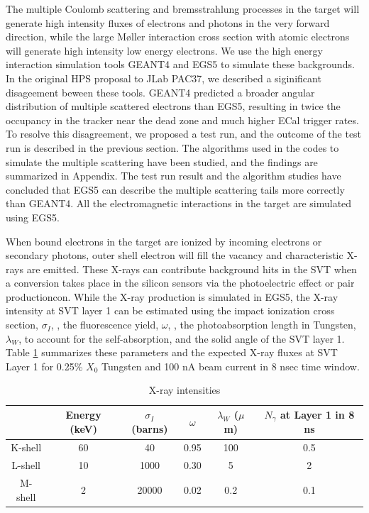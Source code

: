 The multiple Coulomb scattering and bremsstrahlung processes in the target will generate high 
intensity fluxes of electrons and photons in the very forward direction, while the large
M{\o}ller interaction cross section with atomic electrons will generate high intensity low energy
electrons. We use the high energy interaction simulation tools GEANT4 and EGS5 to simulate 
these backgrounds. In the original HPS proposal to JLab PAC37, we described a siginificant 
disageement beween these tools. GEANT4 predicted a broader angular
distribution of multiple scattered electrons than EGS5, resulting in twice the occupancy in the
tracker near the dead zone and much higher ECal trigger rates. 
To resolve this disagreement, we proposed a test run, and the outcome of the test run is described 
in the previous section. The algorithms used 
in the codes to simulate the multiple scattering have been studied, and the findings are summarized in
Appendix. The test run result and the algorithm studies have concluded that EGS5 can describe the multiple scattering 
tails more correctly than GEANT4. All the electromagnetic interactions in the target are simulated using EGS5.   

When bound electrons in the target are ionized by incoming electrons or secondary photons, outer 
shell electron will fill the vacancy and characteristic X-rays are emitted. 
These X-rays can contribute background hits in
the SVT when a conversion takes place in the silicon sensors via the photoelectric effect 
or pair productioncon. While the X-ray production is simulated in EGS5, the X-ray intensity at SVT layer 1
can be estimated using  the impact ionization 
cross section, $\sigma_I$, \cite{hoffmann}, the fluorescence yield, $\omega$, \cite{hubbell},
the photoabsorption length in Tungsten, $\lambda_W$, to account for the self-absorption, and the solid 
angle of the SVT layer 1.
Table \ref{tab:xray} summarizes these parameters and the expected X-ray
fluxes at SVT Layer 1 for 0.25\% $X_0$ Tungsten and 100 nA beam current in 8 nsec time window. 

\begin{table}[h]
\begin{center}
\begin{tabular}{|c|c|c|c|c|c|} \hline
  & Energy (keV) & $\sigma_I$ (barns) & \hspace{0.5 cm} $\omega$ \hspace{0.5 cm} & $\lambda_W$ ($\mu$m) & $N_\gamma$ at Layer 1 in 8 ns   \\ \hline
K-shell & 60 & 40 & 0.95 & 100 & 0.5 \\ \hline
L-shell  & 10 & 1000 & 0.30 & 5 & 2 \\ \hline
M-shell  & 2 & 20000 & 0.02 & 0.2 & 0.1 \\ \hline
\end{tabular}
\end{center}
\caption{\small{X-ray intensities}}
\label{tab:xray}
\end{table}

